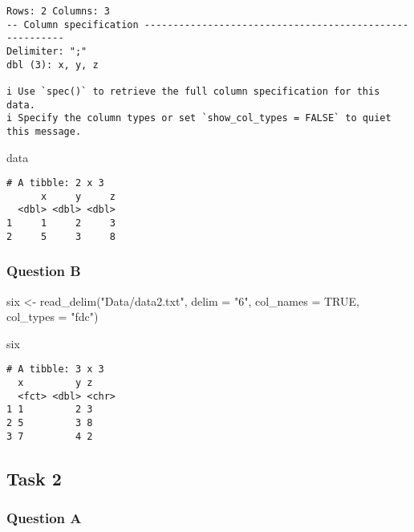 \documentclass[
  letterpaper,
  DIV=11,
  numbers=noendperiod]{scrartcl}
\newenvironment{Shaded}{\begin{snugshade}}{\end{snugshade}}
\newcommand{\AttributeTok}[1]{\textcolor[rgb]{0.40,0.45,0.13}{#1}}
\newcommand{\ConstantTok}[1]{\textcolor[rgb]{0.56,0.35,0.01}{#1}}
\newcommand{\FunctionTok}[1]{\textcolor[rgb]{0.28,0.35,0.67}{#1}}
\newcommand{\NormalTok}[1]{\textcolor[rgb]{0.00,0.23,0.31}{#1}}
\newcommand{\OtherTok}[1]{\textcolor[rgb]{0.00,0.23,0.31}{#1}}
\newcommand{\StringTok}[1]{\textcolor[rgb]{0.13,0.47,0.30}{#1}}
\begin{document}
\begin{verbatim}
Rows: 2 Columns: 3
-- Column specification --------------------------------------------------------
Delimiter: ";"
dbl (3): x, y, z

i Use `spec()` to retrieve the full column specification for this data.
i Specify the column types or set `show_col_types = FALSE` to quiet this message.
\end{verbatim}

\begin{Shaded}
\begin{Highlighting}[]
\NormalTok{data}
\end{Highlighting}
\end{Shaded}

\begin{verbatim}
# A tibble: 2 x 3
      x     y     z
  <dbl> <dbl> <dbl>
1     1     2     3
2     5     3     8
\end{verbatim}

\subsubsection{Question B}\label{question-b}

\begin{Shaded}
\begin{Highlighting}[]
\NormalTok{six }\OtherTok{\textless{}{-}} \FunctionTok{read\_delim}\NormalTok{(}\StringTok{"Data/data2.txt"}\NormalTok{,}
                  \AttributeTok{delim =} \StringTok{"6"}\NormalTok{,}
                  \AttributeTok{col\_names =} \ConstantTok{TRUE}\NormalTok{,}
                  \AttributeTok{col\_types =} \StringTok{"fdc"}\NormalTok{)}

\NormalTok{six}
\end{Highlighting}
\end{Shaded}

\begin{verbatim}
# A tibble: 3 x 3
  x         y z    
  <fct> <dbl> <chr>
1 1         2 3    
2 5         3 8    
3 7         4 2    
\end{verbatim}

\subsection{Task 2}\label{task-2}

\subsubsection{Question A}\label{question-a-1}
\end{document}

